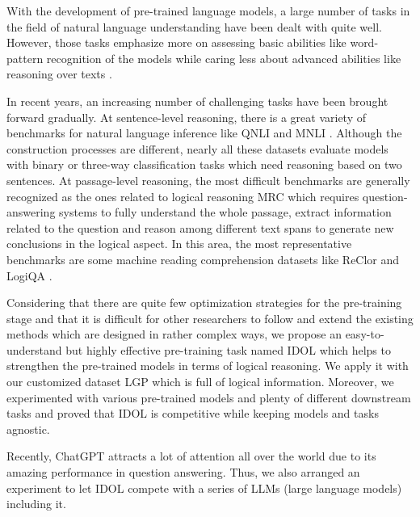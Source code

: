 \documentclass[11pt]{article}
\begin{document}
With the development of pre-trained language models, a large number of tasks in the field of natural language understanding have been dealt with quite well. However, those tasks emphasize more on assessing basic abilities like word-pattern recognition of the models while caring less about advanced abilities like reasoning over texts \cite{reasonanalysis}. 

In recent years, an increasing number of challenging tasks have been brought forward gradually. At sentence-level reasoning, there is a great variety of benchmarks for natural language inference like QNLI \cite{qnli} and MNLI \cite{mnli}. Although the construction processes are different, nearly all these datasets evaluate models with binary or three-way classification tasks which need reasoning based on two sentences. At passage-level reasoning, the most difficult benchmarks are generally recognized as the ones related to logical reasoning MRC which requires question-answering systems to fully understand the whole passage, extract information related to the question and reason among different text spans to generate new conclusions in the logical aspect. In this area, the most representative benchmarks are some machine reading comprehension datasets like ReClor \cite{reclor} and LogiQA \cite{logiqa}.





 Considering that there are quite few optimization strategies for the pre-training stage and that it is difficult for other researchers to follow and extend the existing methods which are designed in rather complex ways, we propose an easy-to-understand but highly effective pre-training task named IDOL which helps to strengthen the pre-trained models in terms of logical reasoning. We apply it with our customized dataset LGP which is full of logical information. Moreover, we experimented with various pre-trained models and plenty of different downstream tasks and proved that IDOL is competitive while keeping models and tasks agnostic.

Recently, ChatGPT attracts a lot of attention all over the world due to its amazing performance in question answering. Thus, we also arranged an experiment to let IDOL compete with a series of LLMs (large language models) including it.
\end{document}
